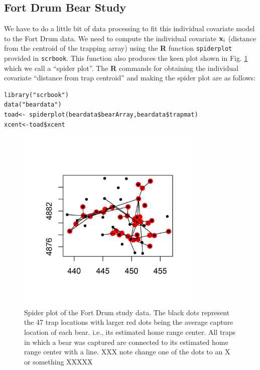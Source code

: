 \subsection{Fort Drum Bear Study}


We have to do a little bit of data processing to fit this individual
covariate model to the Fort Drum data.  We need to compute the
individual covariate ${\bf x}_{i}$ (distance from the centroid of the
trapping array) using the {\bf R} function \mbox{\tt spiderplot}
provided in \mbox{\tt scrbook}. This function also produces the keen
plot shown in Fig. \ref{closed.fig.spiderplot} which we call a
``spider plot''.  The {\bf R} commands for obtaining the individual
covariate ``distance from trap centroid'' and making the spider plot
are as follows:
\begin{verbatim}
library("scrbook")
data("beardata")
toad<- spiderplot(beardata$bearArray,beardata$trapmat)
xcent<-toad$xcent
\end{verbatim}
\begin{figure}
\centering
\includegraphics[height=3.5in,width=3.5in]{Ch3-Closed/figs/bear_spiderplot.png}
\caption{Spider plot of the Fort Drum study data.
The black dots represent the 47 trap locations with larger red dots
being the average capture location of each bear. i.e., its estimated home
range center. All traps in which a bear was captured are connected to
its estimated home range center with a line.
XXX note change one of the dots to an X or something XXXXX
}
\label{closed.fig.spiderplot}
\end{figure}

